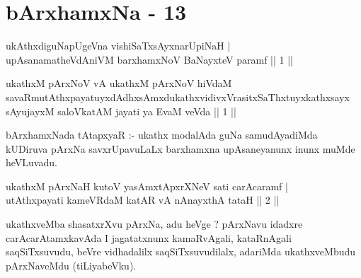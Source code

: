 \chapter{bArxhamxNa - 13}

\begin{shl}
ukAthxdiguNapUgeVna vishiSaTxsAyxnarUpiNaH  | \\
upAsanamatheVdAniVM barxhamxNoV BaNayxteV paramf \hfill ||  1 || 
\end{shl}

\begin{shl}
ukathxM pArxNoV vA ukathxM pArxNoV hiVdaM savaRmutAthxpayatuyxdAdhxsAmxdukathxvidivxVrasitxSaThxtuyxkathxsayx sAyujayxM saloVkatAM jayati ya EvaM veVda || 1 ||
\end{shl}

\begin{artha}
bArxhamxNada tAtapxyaR :- ukathx modalAda guNa samudAyadiMda kUDiruva pArxNa savxrUpavuLaLx barxhamxna upAsaneyanunx inunx muMde heVLuvadu.
\end{artha}


\begin{shl}
\footnotemark[1]{}ukathxM pArxNaH kutoV yasAmxtApxrXNeV sati carAcaramf | \\
\footnotemark[2]{}utAthxpayati kameVRdaM katAR vA nAnayxthA tataH \hfill ||  2 || 
\end{shl}

\begin{artha}
ukathxveMba shasatxrXvu pArxNa, adu heVge ? pArxNavu idadxre carAcarAtamxkavAda I jagatatxnunx kamaRvAgali, kataRnAgali saqSiTxsuvudu, beVre vidhadalilx saqSiTxsuvudilalx, adariMda ukathxveMbudu pArxNaveMdu (tiLiyabeVku).
\end{artha}


